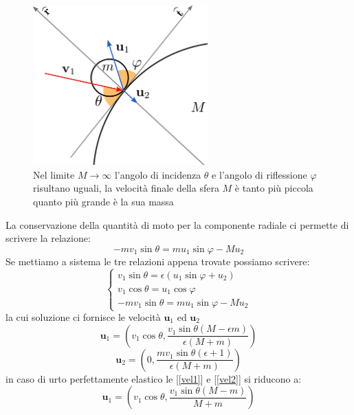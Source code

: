 \documentclass[a4paper,10pt,oneside]{article}
\begin{document}
\begin{figure}[h]
 \centering
 \includegraphics[width=0.6\textwidth]{./immagini/sfere_infinita.png}
 \caption{Nel limite $M\to\infty$ l'angolo di incidenza $\theta$ e l'angolo di riflessione $\varphi$ risultano uguali, la velocità finale della sfera $M$ è tanto più piccola quanto più grande è la sua massa}\label{fig:sfera_infinita}
\end{figure}
La conservazione della quantità di moto per la componente radiale ci permette di scrivere la relazione:
\begin{equation}
 -mv_1\sin\theta=mu_1\sin\varphi-Mu_2
\end{equation}
Se mettiamo a sistema le tre relazioni appena trovate possiamo scrivere:
\begin{equation}
 \begin{cases}
   v_1\sin\theta=\epsilon(u_1\sin\varphi+u_2)\\
   v_1\cos\theta=u_1\cos\varphi\\
   -mv_1\sin\theta=mu_1\sin\varphi-Mu_2
 \end{cases}
\end{equation}
la cui soluzione ci fornisce le velocità $\mathbf{u}_1$ ed $\mathbf{u}_2$
\begin{equation}\label{vel1}
 \mathbf{u}_1=\left(v_1\cos\theta,\frac{v_1\sin\theta(M-\epsilon m)}{\epsilon(M+m)}\right)
\end{equation}
\begin{equation}\label{vel2}
 \mathbf{u}_2=\left(0,\frac{mv_1\sin\theta(\epsilon+1)}{\epsilon(M+m)}\right)
\end{equation}
in caso di urto perfettamente elastico le [\ref{vel1}] e [\ref{vel2}] si riducono a:
\begin{equation}
 \mathbf{u}_1=\left(v_1\cos\theta,\frac{v_1\sin\theta(M-m)}{M+m}\right)
\end{equation}
 
\end{document}
